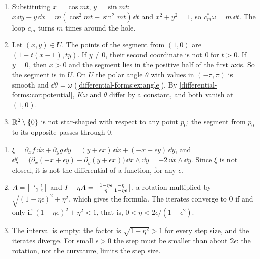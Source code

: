 \begin{enumerate}[nosep]
  \item Substituting $x = \cos mt$, $y = \sin mt$:
        $x\,\dd y - y\,\dd x = m(\cos^2mt + \sin^2mt)\,\dd t$ and
        $x^2 + y^2 = 1$, so $c_m^*\omega = m\,\dd t$. The loop $c_m$
        turns $m$ times around the hole.
  \item Let $(x, y)\in U$. The points of the segment from $(1, 0)$ are
        $(1 + t(x - 1), ty)$. If $y\neq0$, their second coordinate is
        not $0$ for $t > 0$. If $y = 0$, then $x > 0$ and the segment
        lies in the positive half of the first axis. So the segment is
        in $U$. On $U$ the polar angle $\theta$ with values in
        $(-\pi, \pi)$ is smooth and $\dd\theta = \omega$
        (\cref{differential-forms:ex:angle}). By
        \cref{differential-forms:cor:potential}, $K\omega$ and
        $\theta$ differ by a constant, and both vanish at $(1, 0)$.
  \item $\mathbb{R}^2\setminus\{0\}$ is not star-shaped with respect to any
        point $p_0$: the segment from $p_0$ to its opposite passes
        through $0$.
\end{enumerate}

\begin{enumerate}[nosep]
  \item $\xi = \partial_xf\,\dd x + \partial_yg\,\dd y
        = (y + \epsilon x)\,\dd x + (-x + \epsilon y)\,\dd y$, and
        $\dd\xi = \bigl(\partial_x(-x + \epsilon y)
        - \partial_y(y + \epsilon x)\bigr)\,\dd x\wedge\dd y
        = -2\,\dd x\wedge\dd y$. Since $\xi$ is not closed, it is not
        the differential of a function, for any $\epsilon$.
  \item $A = \begin{bsmallmatrix}\epsilon & 1\\ -1 & \epsilon
        \end{bsmallmatrix}$ and $I - \eta A
        = \begin{bsmallmatrix}1 - \eta\epsilon & -\eta\\
        \eta & 1 - \eta\epsilon\end{bsmallmatrix}$, a rotation
        multiplied by $\sqrt{(1 - \eta\epsilon)^2 + \eta^2}$, which
        gives the formula. The iterates converge to $0$ if and only if
        $(1 - \eta\epsilon)^2 + \eta^2 < 1$, that is,
        $0 < \eta < 2\epsilon/(1 + \epsilon^2)$.
  \item The interval is empty: the factor is $\sqrt{1 + \eta^2} > 1$
        for every step size, and the iterates diverge. For small
        $\epsilon > 0$ the step must be smaller than about
        $2\epsilon$: the rotation, not the curvature, limits the step
        size.
\end{enumerate}

